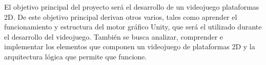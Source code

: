 
El objetivo principal del proyecto será el desarrollo de un videojuego plataformas 2D. De este objetivo principal derivan otros varios, tales como aprender el funcionamiento y estructura del motor gráfico Unity, que será el utilizado durante el desarrollo del videojuego. También se busca analizar, comprender e implementar los elementos que componen un videojuego de plataformas 2D y la arquitectura lógica que permite que funcione.

